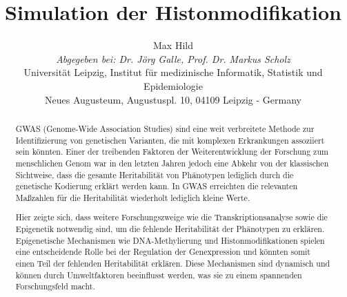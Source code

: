 \documentclass{SeminarV2}
\begin{document}
\title{Simulation der Histonmodifikation}

\author{Max Hild
\vspace{.3cm}\\
%
\emph{Abgegeben bei: Dr. J\"{o}rg Galle, Prof. Dr. Markus Scholz}
\vspace{.1cm}\\
Universit\"{a}t Leipzig, Institut f\"{u}r medizinische Informatik, Statistik und Epidemiologie\\
Neues Augusteum, Augustuspl. 10, 04109 Leipzig - Germany
}



\maketitle

\begin{abstract}
  \sloppy
  GWAS (Genome-Wide Association Studies) sind eine weit verbreitete Methode
  zur Identifizierung von genetischen Varianten, die mit komplexen Erkrankungen assoziiert sein k\"{o}nnten.
  Einer der treibenden Faktoren der Weiterentwicklung der Forschung zum menschlichen Genom
  war in den letzten Jahren jedoch eine Abkehr von der klassischen Sichtweise, dass die
  gesamte Heritabilit\"{a}t von Ph\"{a}notypen lediglich durch die genetische Kodierung
  erkl\"{a}rt werden kann. In GWAS erreichten die relevanten Ma{\ss}zahlen f\"{u}r die Heritabilit\"{a}t
  wiederholt lediglich kleine Werte. \cite{mcclellan-2010}
    
  Hier zeigte sich, dass weitere Forschungszweige wie die Transkriptionsanalyse
  sowie die Epigenetik notwendig sind, um die fehlende Heritabilit\"{a}t der Ph\"{a}notypen zu erkl\"{a}ren. 
  Epigenetische Mechanismen wie DNA-Methylierung und Histonmodifikationen spielen eine entscheidende 
  Rolle bei der Regulation der Genexpression und k\"{o}nnten somit einen Teil der fehlenden Heritabilit\"{a}t 
  erkl\"{a}ren. Diese Mechanismen sind dynamisch und k\"{o}nnen durch Umweltfaktoren beeinflusst werden, 
  was sie zu einem spannenden Forschungsfeld macht.
  \end{abstract}
  
\end{document}
